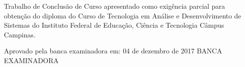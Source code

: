 \begin{folhadeaprovacao}
\linespread{1.5}

  \begin{center}
    {\chapterfont \insereautor}
    \vfill\vspace{2cm}
    {\chapterfont\bfseries \inseretitulo}
    \vfill\vspace{1.5cm}
    \end{center}
    
    \hspace{.45\textwidth}
    \begin{minipage}{.47\linewidth}
	\vfill	
	Trabalho de Conclus\~{a}o de Curso apresentado como exig\^encia parcial para obten\c{c}\~{a}o do diploma do Curso de Tecnologia em An\'{a}lise e Desenvolvimento de Sistemas do Instituto Federal de Educa\c{c}\~{a}o, Ci\^{e}ncia e Tecnologia C\^{a}mpus Campinas.
    \end{minipage}
\vfill\vspace{1cm}  

\begin{center}
Aprovado pela banca examinadora em: 04 de dezembro de 2017
\vfill \vspace{1cm}
{\large BANCA EXAMINADORA}
\end{center}
\end{folhadeaprovacao}
